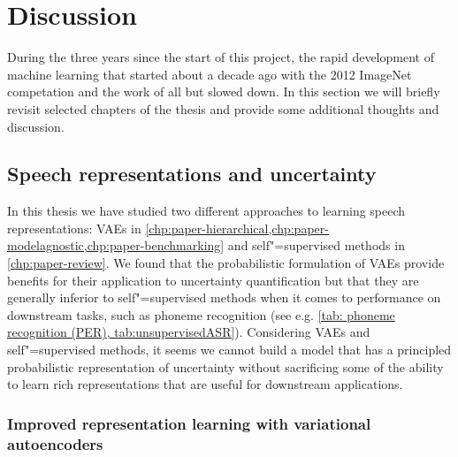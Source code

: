 
\chapter[discussion]{Discussion}\label{chp:discussion}
%

During the three years since the start of this project, the rapid development of machine learning that started about a decade ago with the 2012 ImageNet competation and the work of \textcite{krizhevsky_imagenet_2012} all but slowed down. 
In this section we will briefly revisit selected chapters of the thesis and provide some additional thoughts and discussion. 


\section{Speech representations and uncertainty}
%
In this thesis we have studied two different approaches to learning speech representations: VAEs in \cref{chp:paper-hierarchical,chp:paper-modelagnostic,chp:paper-benchmarking} and self"=supervised methods in \cref{chp:paper-review}. 
We found that the probabilistic formulation of VAEs provide benefits for their application to uncertainty quantification but that they are generally inferior to self"=supervised methods when it comes to performance on downstream tasks, such as phoneme recognition (see e.g. \cref{tab: phoneme recognition (PER), tab:unsupervisedASR}). 
Considering VAEs and self"=supervised methods, it seems we cannot build a model that has a principled probabilistic representation of uncertainty without sacrificing some of the ability to learn rich representations that are useful for downstream applications. 









\subsection{Improved representation learning with variational autoencoders}

